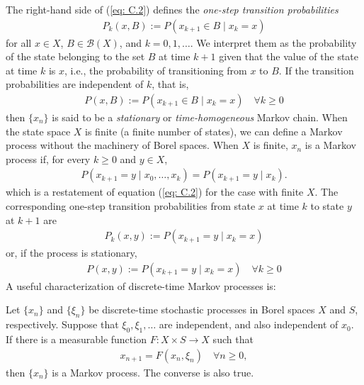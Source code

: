 \documentclass[\topdir/lecture\_notes.tex]{subfiles}
\begin{document}
The right-hand side of (\ref{eq: C.2}) defines the \emph{one-step transition probabilities}
\begin{align*}
P_{k}(x, B):=P(x_{k+1} \in B \mid x_{k}=x)
\end{align*}
for all $x \in X$, $B \in \mathcal{B}(X)$, and $k=0,1, \ldots$. We interpret them as the probability of the state belonging to the set $B$ at time $k+1$ given that the value of the state at time $k$ is $x$, i.e., the probability of transitioning from $x$ to $B$. If the transition probabilities are independent of $k$, that is,
\begin{align*}
P(x, B) := P(x_{k+1} \in B \mid x_{k}=x) \quad \forall k \geq 0
\end{align*}
then $\{x_{n}\}$ is said to be a \emph{stationary} or \emph{time-homogeneous} Markov chain. When the state space $X$ is finite (a finite number of states), we can define a Markov process without the machinery of Borel spaces. When $X$ is finite, ${x_n}$ is a Markov process if, for every $k\geq 0$ and $y \in X$, 
\begin{align*}
    P(x_{k+1} = y \mid x_{0}, \ldots, x_{k})=P(x_{k+1} = y \mid x_{k}). 
\end{align*}
which is a restatement of equation (\ref{eq: C.2}) for the case with finite $X$. The corresponding one-step transition probabilities from state $x$ at time $k$ to state $y$ at $k+1$ are
\begin{align*}
P_{k}(x, y):=P(x_{k+1} = y \mid x_{k}=x)
\end{align*}
or, if the process is stationary,
\begin{align*}
P(x, y) := P(x_{k+1} = y \mid x_{k}=x) \quad \forall k \geq 0
\end{align*}
A useful characterization of discrete-time Markov processes is:
\begin{proposition}\label{prop: mc}
Let $\{x_{n}\}$ and $\{\xi_{n}\}$ be discrete-time stochastic processes in Borel spaces $X$ and $S$, respectively. Suppose that $\xi_{0}, \xi_{1}, \ldots$ are independent, and also independent of $x_{0}$. If there is a measurable function $F: X \times S \rightarrow X$ such that
\begin{align}
x_{n+1}=F(x_{n}, \xi_{n}) \quad \forall n \geq 0, \label{eq: C.4}
\end{align}
then $\{x_{n}\}$ is a Markov process. The converse is also true.
\end{proposition}
\end{document}
